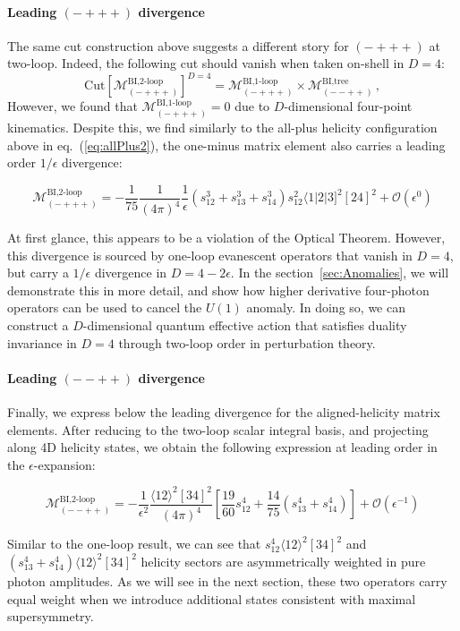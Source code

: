 \documentclass[11pt,letter]{article}
\def\sect#1{section~\ref{#1}}
\def\eqn#1{eq.~(\ref{#1})}
\begin{document}
\paragraph{Leading $(-+++)$ divergence} The same cut construction above suggests a different story for $(-+++)$ at two-loop. Indeed, the following cut should vanish when taken on-shell in $D=4$:
\begin{equation}
\text{Cut}\left[\mathcal{M}^{\text{BI,2-loop}}_{(-+++)} \right]^{D=4} = \mathcal{M}^{\text{BI,1-loop}}_{(-+++)} \times \mathcal{M}^{\text{BI,tree}}_{(--++)}\,,
\end{equation}
However, we found that $\mathcal{M}^{\text{BI,1-loop}}_{(-+++)} =0$ due to $D$-dimensional four-point kinematics. Despite this, we find similarly to the all-plus helicity configuration above in \eqn{eq:allPlus2}, the one-minus matrix element {also} carries a leading order $1/\epsilon$ divergence:
\begin{eBox}
\begin{equation}
\mathcal{M}^{\text{BI,2-loop}}_{(-+++)} = -\frac{1}{75} \frac{1}{(4\pi)^4}\frac{1}{\epsilon}(s_{12}^3+s_{13}^3+s_{14}^3)s_{12}^2 \langle 1|2|3]^2[24]^2 +\mathcal{O}(\epsilon^0)
\label{eq:oneMinus2loop}
\end{equation}
\end{eBox}
At first glance, this appears to be a violation of the Optical Theorem. However, this divergence is sourced by one-loop evanescent operators that vanish in $D=4$, but carry a $1/\epsilon$ divergence in $D=4-2\epsilon$. In the \sect{sec:Anomalies}, we will demonstrate this in more detail, and show how higher derivative four-photon operators can be used to cancel the $U(1)$ anomaly. In doing so, we can construct a $D$-dimensional quantum effective action that satisfies duality invariance in $D=4$ through two-loop order in perturbation theory.  
\paragraph{Leading $(--++)$ divergence} 
Finally, we express below the leading divergence for the aligned-helicity matrix elements. After reducing to the two-loop scalar integral basis, and projecting along 4D helicity states, we obtain the following expression at leading order in the $\epsilon$-expansion:
\begin{eBox}
\begin{equation}
\mathcal{M}^{\text{BI,2-loop}}_{(--++)} = -\frac{1}{\epsilon^2}\frac{\langle12\rangle^2[34]^2}{(4\pi)^4}\left[\frac{19}{60}s_{12}^4+\frac{14}{75}(s_{13}^4+s_{14}^4)\right]+\mathcal{O}(\epsilon^{-1})
\end{equation}
\end{eBox}
Similar to the one-loop result, we can see that $s_{12}^4 \langle12\rangle^2[34]^2$ and $(s_{13}^4+s_{14}^4)\langle12\rangle^2[34]^2$ helicity sectors are asymmetrically weighted in pure photon amplitudes. As we will see in the next section, these two operators carry equal weight when we introduce additional states consistent with maximal supersymmetry. 
\end{document}
